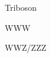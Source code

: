 \documentclass[10pt]{article}
\begin{document}
Triboson

WWW

WWZ/ZZZ

















 



\end{document}

